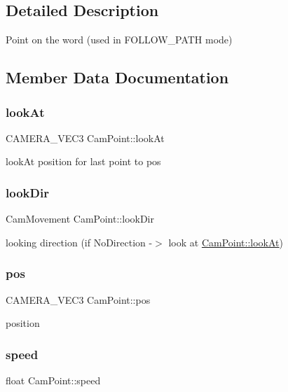 \subsection{Detailed Description}
Point on the word (used in F\+O\+L\+L\+O\+W\+\_\+\+P\+A\+TH mode) 

\subsection{Member Data Documentation}
\mbox{\label{struct_cam_point_a5f58524872784b39ec00277775166679}} 
\subsubsection{\texorpdfstring{look\+At}{lookAt}}
{\footnotesize\ttfamily C\+A\+M\+E\+R\+A\+\_\+\+V\+E\+C3 Cam\+Point\+::look\+At}

look\+At position for last point to pos \mbox{\label{struct_cam_point_a9adfb35cbba2a45bc92c59af6ef0b829}} 
\subsubsection{\texorpdfstring{look\+Dir}{lookDir}}
{\footnotesize\ttfamily Cam\+Movement Cam\+Point\+::look\+Dir}

looking direction (if No\+Direction -\/$>$ look at \hyperlink{struct_cam_point_a5f58524872784b39ec00277775166679}{Cam\+Point\+::look\+At}) \mbox{\label{struct_cam_point_a838dcf4ad928c2537c504819558b48cf}} 
\subsubsection{\texorpdfstring{pos}{pos}}
{\footnotesize\ttfamily C\+A\+M\+E\+R\+A\+\_\+\+V\+E\+C3 Cam\+Point\+::pos}

position \mbox{\label{struct_cam_point_af76796aa17e711865e47e737693f6fc5}} 
\subsubsection{\texorpdfstring{speed}{speed}}
{\footnotesize\ttfamily float Cam\+Point\+::speed}

